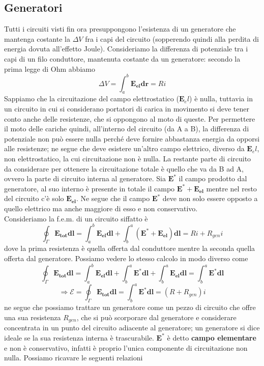\documentclass[
10pt, %
a4paper, %
oneside, %
headinclude,footinclude, %
BCOR5mm, %
]{scrartcl}
\begin{document}
\subsection{Generatori}
Tutti i circuiti visti fin ora presuppongono l'esistenza di un generatore che mantenga costante la \(\Delta V\) fra i capi del circuito (sopperendo quindi alla perdita di energia dovuta all'effetto Joule). Consideriamo la differenza di potenziale tra i capi di un filo conduttore, mantenuta costante da un generatore: secondo la prima legge di Ohm abbiamo
\[\Delta V = \int_a^b \mathbf{E_{el}}\mathbf{dr}= Ri\]
Sappiamo che la circuitazione del campo elettrostatico (\(\mathbf{E}_el\)) è nulla, tuttavia in un circuito in cui si considerano portatori di carica in movimento si deve tener conto anche delle resistenze, che si oppongono al moto di queste. Per permettere il moto delle cariche quindi, all'interno del circuito (da A a B), la differenza di potenziale non può essere nulla perché deve fornire abbastanza energia da opporsi alle resistenze; ne segue che deve esistere un'altro campo elettrico, diverso da \(\mathbf{E}_el\), non elettrostatico, la cui circuitazione non è nulla. La restante parte di circuito da considerare per ottenere la circuitazione totale è quello che va da B ad A, ovvero la parte di circuito interna al generatore. Sia \(\mathbf{E^*}\) il campo prodotto dal generatore, al suo interno è presente in totale il campo \(\mathbf{E^*}+\mathbf{E_{el}}\) mentre nel resto del circuito c'è solo \(\mathbf{E_{el}}\). Ne segue che il campo \(\mathbf{E^*}\) deve non solo essere opposto a quello elettrico ma anche maggiore di esso e non conservativo.\\
Consideriamo la f.e.m. di un circuito siffatto è 
\[\oint_{\Gamma}\mathbf{E_{tot}}\mathbf{dl}= \int_{a}^{b}\mathbf{E_{el}}\mathbf{dl}+\int_{b}^{a}(\mathbf{E^*}+\mathbf{E_{el}})\mathbf{dl}= Ri + R_{gen}i\]
dove la prima resistenza è quella offerta dal conduttore mentre la seconda quella offerta dal generatore. Possiamo vedere lo stesso calcolo in modo diverso come
\[\oint_{\Gamma}\mathbf{E_{tot}}\mathbf{dl}= \int_{a}^{b}\mathbf{E_{el}}\mathbf{dl} + \int_{b}^{a}\mathbf{E^*}\mathbf{dl} +  \int_{b}^{a}\mathbf{E_{el}}\mathbf{dl}= \int_{b}^{a}\mathbf{E^*}\mathbf{dl}\]
\[\Rightarrow \mathcal{E} = \oint_{\Gamma}\mathbf{E_{tot}}\mathbf{dl} = \int_{b}^{a}\mathbf{E^*}\mathbf{dl} = (R + R_{gen})i \]
ne segue che possiamo trattare un generatore come un pezzo di circuito che offre una sua resistenza \(R_{gen}\), che si può scorporare dal generatore e considerare concentrata in un punto del circuito adiacente al generatore; un generatore si dice ideale se la sua resistenza interna è trascurabile. \(\mathbf{E^*}\) è detto \textbf{campo elementare} e non è conservativo, infatti è proprio l'unica componente di circuitazione non nulla. Possiamo ricavare le seguenti relazioni
\end{document}
